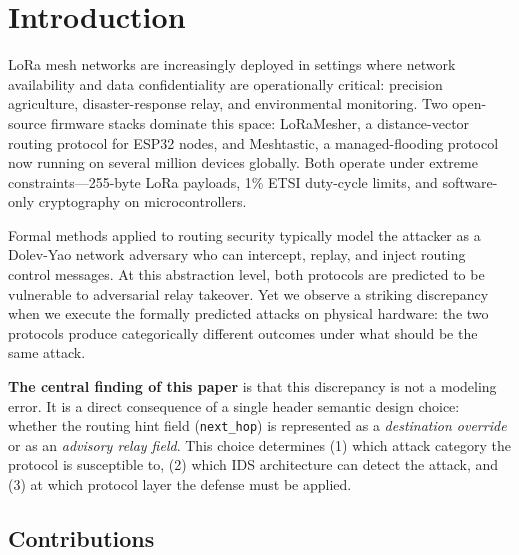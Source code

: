 \documentclass[journal]{IEEEtran}
\begin{document}
\section{Introduction}
\label{sec:intro}

LoRa mesh networks are increasingly deployed in settings where network
availability and data confidentiality are operationally critical:
precision agriculture, disaster-response relay, and
environmental monitoring. Two open-source firmware stacks dominate
this space: LoRaMesher, a distance-vector routing protocol for ESP32 nodes,
and Meshtastic, a managed-flooding protocol now running on several million
devices globally. Both operate under extreme constraints---255-byte LoRa
payloads, 1\% ETSI duty-cycle limits, and software-only cryptography on
microcontrollers.

Formal methods applied to routing security typically model the attacker as a
Dolev-Yao network adversary who can intercept, replay, and inject routing
control messages. At this abstraction level, both protocols are predicted to
be vulnerable to adversarial relay takeover. Yet we observe a striking
discrepancy when we execute the formally predicted attacks on physical
hardware: the two protocols produce categorically different outcomes under
what should be the same attack.

\textbf{The central finding of this paper} is that this discrepancy is not
a modeling error. It is a direct consequence of a single header semantic
design choice: whether the routing hint field (\texttt{next\_hop}) is
represented as a \emph{destination override} or as an \emph{advisory relay
field}. This choice determines (1) which attack category the protocol is
susceptible to, (2) which IDS architecture can detect the attack, and
(3) at which protocol layer the defense must be applied.

\subsection{Contributions}
\end{document}
